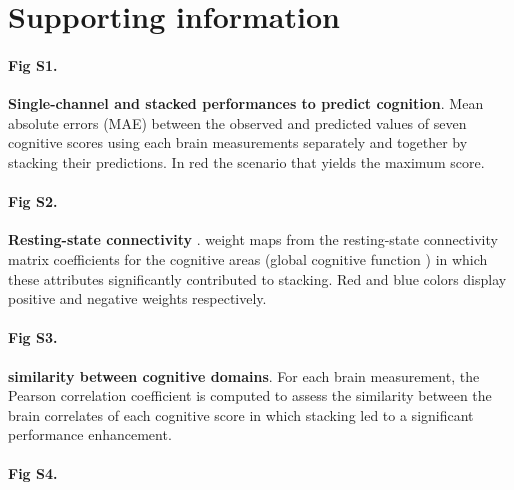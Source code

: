 \documentclass[10pt,letterpaper]{article}
\begin{document}
\section*{Supporting information}

\paragraph*{Fig S1.}
\label{fig:figS1}
{\bf Single-channel and stacked performances to predict cognition}. Mean absolute errors (MAE) between the observed and predicted values of seven cognitive scores using each brain measurements separately and together by stacking their predictions. In red the scenario that yields the maximum score.

\paragraph*{Fig S2.}
\label{fig:figS2}
{\bf Resting-state connectivity }.  weight maps from the resting-state connectivity matrix coefficients for the  cognitive areas (global cognitive function ) in which these attributes significantly contributed to stacking. Red and blue colors display positive and negative weights respectively. 

\paragraph*{Fig S3.}
\label{fig:figS3}
{\bf {} similarity between cognitive domains}. For each brain measurement, the Pearson correlation coefficient is computed to assess the similarity between the brain correlates of each cognitive score in which stacking led to a significant performance enhancement. 

\paragraph*{Fig S4.}
\label{fig:figS4}
\end{document}
